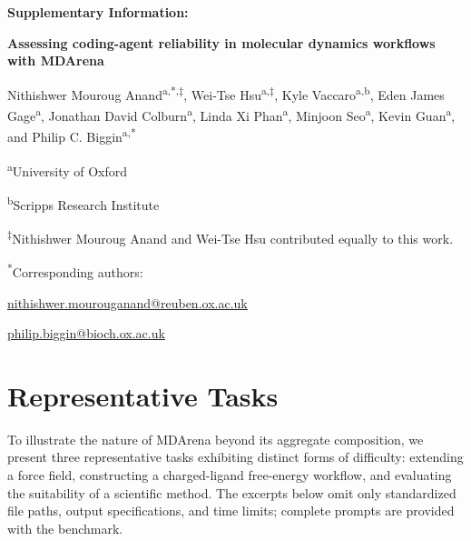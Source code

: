 \documentclass[11pt,a4paper]{article}
\begin{document}
\begin{titlepage}
\centering
\vspace*{1cm}
{\Large\bfseries Supplementary Information:\par}
\vspace{0.4cm}
{\LARGE\bfseries Assessing coding-agent reliability in molecular dynamics workflows with MDArena\par}
\vspace{1cm}
{\large Nithishwer Mouroug Anand\textsuperscript{a,*,$\ddagger$},
Wei-Tse Hsu\textsuperscript{a,$\ddagger$},
Kyle Vaccaro\textsuperscript{a,b},
Eden James Gage\textsuperscript{a},
Jonathan David Colburn\textsuperscript{a},
Linda Xi Phan\textsuperscript{a},
Minjoon Seo\textsuperscript{a},
Kevin Guan\textsuperscript{a}, and
Philip C. Biggin\textsuperscript{a,*}\par}
\vspace{0.8cm}
\textsuperscript{a}University of Oxford\par
\vspace{0.2cm}
\textsuperscript{b}Scripps Research Institute\par
\vspace{0.8cm}
\textsuperscript{$\ddagger$}Nithishwer Mouroug Anand and Wei-Tse Hsu contributed equally to this work.\par
\vspace{0.5cm}
\textsuperscript{*}Corresponding authors:\par
\href{mailto:nithishwer.mourouganand@reuben.ox.ac.uk}{nithishwer.mourouganand@reuben.ox.ac.uk}\par
\href{mailto:philip.biggin@bioch.ox.ac.uk}{philip.biggin@bioch.ox.ac.uk}\par
\vfill
\end{titlepage}
\setcounter{page}{2}
\tableofcontents
\clearpage



\section{Representative Tasks}
\label{app:representative_tasks}

To illustrate the nature of MDArena beyond its aggregate composition, we present three representative tasks exhibiting distinct forms of difficulty: extending a force field, constructing a charged-ligand free-energy workflow, and evaluating the suitability of a scientific method. The excerpts below omit only standardized file paths, output specifications, and time limits; complete prompts are provided with the benchmark.
\end{document}
